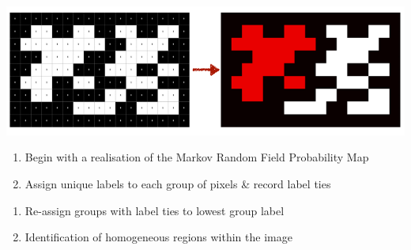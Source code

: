 \documentclass[a0paper,portrait,fontscale=0.3]{baposter}
\begin{document}
\begin{poster}
{\noindent
\includegraphics[width=\linewidth]{connectedcomponents}
\begin{minipage}{\linewidth}
	\begin{minipage}{0.48\linewidth}
		\begin{enumerate}[leftmargin=*]
			\item Begin with a realisation of the Markov Random Field Probability Map 
			\item Assign unique labels to each group of pixels \& record label ties
		\end{enumerate}
	\end{minipage}\hfill
	\begin{minipage}{0.48\linewidth}
		\begin{enumerate}[leftmargin=*]\addtocounter{enumi}{2}
			\item Re-assign groups with label ties to lowest group label
			\item Identification of homogeneous regions within the image
		\end{enumerate}
	\end{minipage}
\end{minipage}
\vspace{0.3em}
}

\end{poster}
\end{document}
